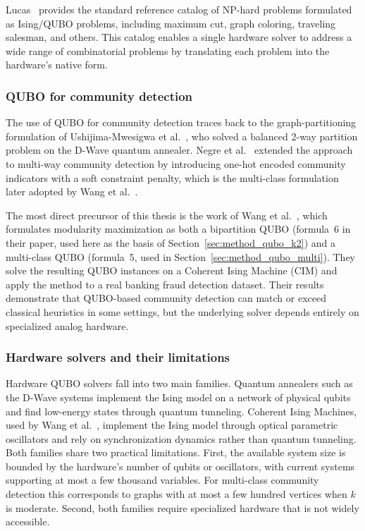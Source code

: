 Lucas~\cite{lucas2014ising} provides the standard reference catalog
of NP-hard problems formulated as Ising/QUBO problems, including
maximum cut, graph coloring, traveling salesman, and others. This
catalog enables a single hardware solver to address a wide range of
combinatorial problems by translating each problem into the
hardware's native form.

\subsubsection{QUBO for community detection}
\label{sec:rw_qubo_cd}

The use of QUBO for community detection traces back to the
graph-partitioning formulation of Ushijima-Mwesigwa et
al.~\cite{ushijima2017graph}, who solved a balanced 2-way partition
problem on the D-Wave quantum annealer. Negre et
al.~\cite{negre2020detecting} extended the approach to multi-way
community detection by introducing one-hot encoded community
indicators with a soft constraint penalty, which is the
multi-class formulation later adopted by Wang et
al.~\cite{wang2024quantum}.

The most direct precursor of this thesis is the work of Wang et
al.~\cite{wang2024quantum}, which formulates modularity maximization
as both a bipartition QUBO (formula~6 in their paper, used here as
the basis of Section~\ref{sec:method_qubo_k2}) and a multi-class
QUBO (formula~5, used in Section~\ref{sec:method_qubo_multi}). They
solve the resulting QUBO instances on a Coherent Ising Machine
(CIM) and apply the method to a real banking fraud detection
dataset. Their results demonstrate that QUBO-based community
detection can match or exceed classical heuristics in some settings,
but the underlying solver depends entirely on specialized analog
hardware.

\subsubsection{Hardware solvers and their limitations}
\label{sec:rw_hardware}

Hardware QUBO solvers fall into two main families. Quantum annealers
such as the D-Wave systems implement the Ising model on a network
of physical qubits and find low-energy states through quantum
tunneling. Coherent Ising Machines, used by Wang et
al.~\cite{wang2024quantum}, implement the Ising model through
optical parametric oscillators and rely on synchronization dynamics
rather than quantum tunneling. Both families share two practical
limitations. First, the available system size is bounded by the
hardware's number of qubits or oscillators, with current systems
supporting at most a few thousand variables. For multi-class
community detection this corresponds to graphs with at most a few
hundred vertices when $k$ is moderate. Second, both families require
specialized hardware that is not widely accessible.


